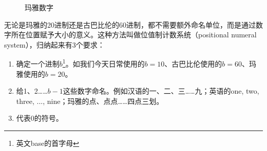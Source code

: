 \documentclass[b5paper]{ctexart}
\begin{document}
\begin{figure}[htbp]
 \centering
 \caption{玛雅数字}
 \label{fig:maya-numerals}
\end{figure}

无论是玛雅的20进制还是古巴比伦的60进制，都不需要额外命名单位，而是通过数字所在位置赋予大小的意义。这种方法叫做位值制计数系统（positional numeral system），归纳起来有3个要求：

\begin{enumerate}
\item 确定一个进制$b$\footnote{英文base的首字母}。如我们今天日常使用的$b = 10$、古巴比伦使用的$b = 60$、玛雅使用的$b = 20$。
\item 给1、2……$b-1$这些数字命名。例如汉语的一、二、三……九；英语的one, two, three, ..., nine；玛雅的点、点点……四点三划。
\item 代表0的符号。
\end{enumerate}
\end{document}
